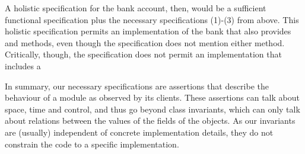 A  holistic  specification for the bank account, then,
would be a sufficient functional specification
plus the necessary
specifications (1)-(3) from above. %
This holistic specification
permits an implementation of the bank that also provides  
and  methods, even though the specification does not mention either method.
Critically, though, the \Chainmail specification
does not permit an
implementation that includes a  

 
\vspace{.1cm} 

In summary, our  necessary specifications are assertions that describe the
behaviour of a module as observed by its clients. 
These assertions
 can talk about space, time and control, and thus go beyond
 class invariants, which can only
talk   about relations between the  values of the fields of the objects.
As our invariants are (usually) independent of concrete implementation details, they do not constrain the code to a
specific implementation.
